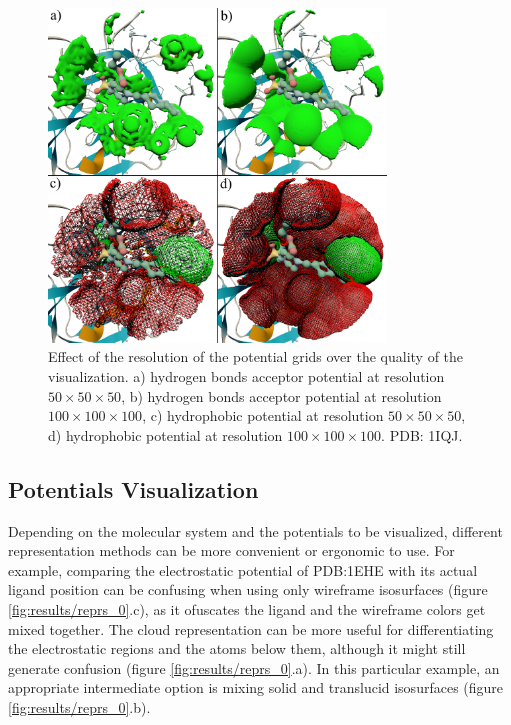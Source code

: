     \begin{figure}[H]
      \centering
      \includegraphics[width=0.8\textwidth]{figures/results/resolution.png}
      \caption{\label{fig:results/resolution} Effect of the resolution of the potential grids over the quality of the visualization. a) hydrogen bonds acceptor potential at resolution $50 \times 50 \times 50$, b) hydrogen bonds acceptor potential at resolution $100 \times 100 \times 100$, c) hydrophobic potential at resolution $50 \times 50 \times 50$, d) hydrophobic potential at resolution $100 \times 100 \times 100$. PDB: 1IQJ.}
    \end{figure}

  \subsection{Potentials Visualization}
    Depending on the molecular system and the potentials to be visualized, different representation methods can be more convenient or ergonomic to use. For example, comparing the electrostatic potential of PDB:1EHE with its actual ligand position can be confusing when using only wireframe isosurfaces (figure \ref{fig:results/reprs_0}.c), as it ofuscates the ligand and the wireframe colors get mixed together. The cloud representation can be more useful for differentiating the electrostatic regions and the atoms below them, although it might still generate confusion (figure \ref{fig:results/reprs_0}.a). In this particular example, an appropriate intermediate option is mixing solid and translucid isosurfaces (figure \ref{fig:results/reprs_0}.b).

